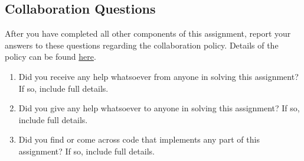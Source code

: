 \documentclass[11pt,addpoints,answers]{exam}
\begin{document}
\begin{questions}
\clearpage
\newpage
\newpage
\section{Collaboration Questions}
After you have completed all other components of this assignment, report your answers to these questions regarding the collaboration policy. Details of the policy can be found \href{http://www.cs.cmu.edu/~mgormley/courses/10601/syllabus.html}{here}.
\begin{enumerate}
    \item Did you receive any help whatsoever from anyone in solving this assignment? If so, include full details.
    \item Did you give any help whatsoever to anyone in solving this assignment? If so, include full details.
    \item Did you find or come across code that implements any part of this assignment? If so, include full details.
\end{enumerate}

\begin{your_solution}[height=6cm]

\end{your_solution}
\newpage
\end{questions}
\end{document}
